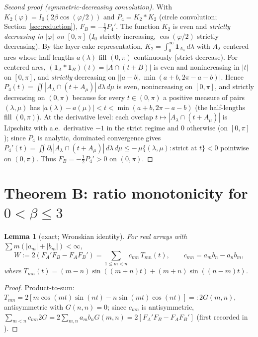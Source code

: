 \documentclass[11pt]{article}
\newtheorem{lemma}[theorem]{Lemma}
\theoremstyle{remark}
\newcommand{\FA}{F_{\!A}}
\newcommand{\FB}{F_{\!B}}
\newcommand{\dd}{\,d}
\begin{document}
\begin{proof}[Second proof (symmetric-decreasing convolution)]
With $K_2(\varphi)=I_0(2\beta\cos(\varphi/2))$ and $P_4=K_2*K_2$ (circle
convolution; Section~\ref{sec:reduction}), $\FB=-\tfrac12P_4'$. The
function $K_2$ is even and \emph{strictly decreasing in $|\varphi|$ on
$[0,\pi]$} ($I_0$ strictly increasing, $\cos(\varphi/2)$ strictly
decreasing). By the layer-cake representation, $K_2=\int_0^\infty
\mathbf 1_{A_\lambda}\dd\lambda$ with $A_\lambda$ centered arcs whose
half-lengths $a(\lambda)$ fill $(0,\pi)$ continuously (strict decrease).
For centered arcs, $(\mathbf 1_{A}*\mathbf 1_{B})(t)=|A\cap(t+B)|$ is
even and nonincreasing in $|t|$ on $[0,\pi]$, and \emph{strictly}
decreasing on $||a-b|,\min(a+b,2\pi-a-b)|$. Hence
$P_4(t)=\iint |A_\lambda\cap(t+A_\mu)|\dd\lambda\dd\mu$ is even,
nonincreasing on $[0,\pi]$, and strictly decreasing on $(0,\pi)$ because
for every $t\in(0,\pi)$ a positive measure of pairs $(\lambda,\mu)$ has
$|a(\lambda)-a(\mu)|<t<\min(a+b,2\pi-a-b)$ (the half-lengths fill
$(0,\pi)$). At the derivative level: each overlap $t\mapsto|A_\lambda\cap(t+A_\mu)|$
is Lipschitz with a.e.\ derivative $-1$ in the strict regime and $0$
otherwise (on $[0,\pi]$); since $P_4$ is analytic, dominated convergence
gives $P_4'(t)=\iint\partial_t|A_\lambda\cap(t+A_\mu)|\dd\lambda\dd\mu
\le-\,\mu\{(\lambda,\mu):\text{strict at }t\}<0$ pointwise on $(0,\pi)$.
Thus $\FB=-\tfrac12P_4'>0$ on $(0,\pi)$.
\end{proof}

\section{Theorem B: ratio monotonicity for $0<\beta\le3$}\label{sec:thmB}

\begin{lemma}[exact; Wronskian identity]\label{lem:wronskian}
For real arrays with $\sum m(|a_m|+|b_m|)<\infty$,
\begin{equation}\label{eq:wronskian}
W:=2(\FA'\FB-\FA\FB')=\sum_{1\le m<n}c_{mn}\,T_{mn}(t),\qquad
c_{mn}=a_mb_n-a_nb_m,
\end{equation}
where $T_{mn}(t)=(m-n)\sin((m+n)t)+(m+n)\sin((n-m)t)$.
\end{lemma}

\begin{proof}
Product-to-sum: $T_{mn}=2[m\cos(mt)\sin(nt)-n\sin(mt)\cos(nt)]=:2G(m,n)$,
antisymmetric with $G(n,n)=0$; since $c_{mn}$ is antisymmetric,
$\sum_{m<n}c_{mn}2G=2\sum_{m,n}a_mb_nG(m,n)=2[\FA'\FB-\FA\FB']$
\textup{(}first recorded in \cite{WronskianNote}\textup{)}.
\end{proof}
\end{document}
